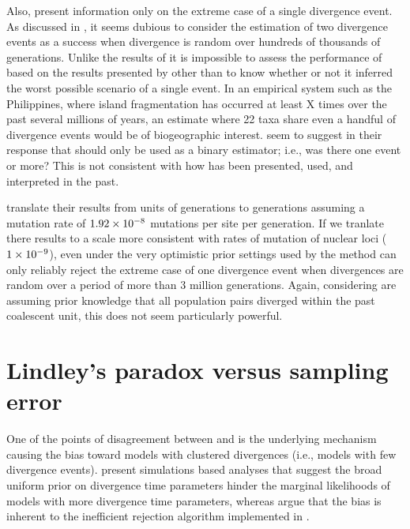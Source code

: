 \documentclass[letterpaper,12pt]{article}
\begin{document}
\begin{linenumbers}
Also, \citet{Hickerson2013} present information only on the extreme case of a
single divergence event.
As discussed in \citet{Oaks2012}, it seems dubious to consider the estimation
of two divergence events as a success when divergence is random over hundreds
of thousands of generations.
Unlike the results of \citet{Oaks2012} it is impossible to assess the
performance of \msb based on the results presented by \cite{Hickerson2013}
other than to know whether or not it inferred the worst possible scenario of a
single event.
In an empirical system such as the Philippines, where island fragmentation
has occurred at least X times over the past several millions of years, an
estimate where 22 taxa share even a handful of divergence events would be
of biogeographic interest.
\citet{Hickerson2013} seem to suggest in their response that \msb should only
be used as a binary estimator; i.e., was there one event or more?
This is not consistent with how \msb has been presented, used, and interpreted
in the past.

\citet{Hickerson2013} translate their results from units of
\globalcoalunit generations to generations assuming a mutation rate of
$1.92\times 10^{-8}$ mutations per site per generation.
If we tranlate there results to a scale more consistent with rates of mutation
of nuclear loci ($1\times 10^{-9}$), even under the very optimistic prior settings used
by \citet{Hickerson2013} the method can only reliably reject the extreme case
of one divergence event when divergences are random over a period of more than
3 million generations.
Again, considering \citet{Hickerson2013} are assuming prior knowledge that
all population pairs diverged within the past coalescent unit, this
does not seem particularly powerful.




\section*{Lindley's paradox versus sampling error}
One of the points of disagreement between \citet{Hickerson2013} and
\citet{Oaks2012} is the underlying mechanism causing the bias toward models
with clustered divergences (i.e., models with few divergence events).
\citet{Oaks2012} present simulations based analyses that suggest the broad
uniform prior on divergence time parameters hinder the marginal likelihoods of
models with more divergence time parameters, whereas \citet{Hickerson2013}
argue that the bias is inherent to the inefficient rejection algorithm
implemented in \msb.


\end{linenumbers}
\end{document}
